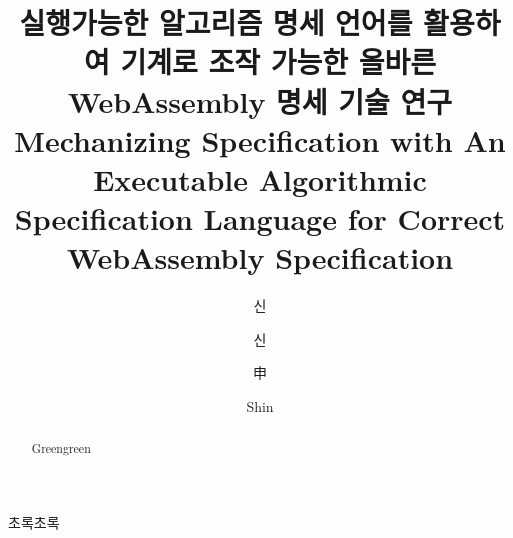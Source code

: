 \documentclass[master,english,draft]{kaist-ucs} %
\title[korean] {실행가능한 알고리즘 명세 언어를 활용하여 기계로 조작 가능한 올바른 WebAssembly 명세 기술 연구}
\title[english]{Mechanizing Specification with An Executable Algorithmic Specification Language for Correct WebAssembly Specification}
\author[korean] {신}{원 호}
\author[korean2] {신}{원호}    %
\author[chinese]{申}{元 鎬}
\author[english]{Shin}{Wonho}
\begin{document}

 \thesisinfo
  \begin{summary}
  초록초록

  \end{summary}

  \begin{Korkeyword}
  \end{Korkeyword}


  \begin{abstract}
  Greengreen
  \end{abstract}

  \begin{Engkeyword}
  \end{Engkeyword}


  \addtocounter{pagemarker}{1}                 %
  \newpage



  \tableofcontents

  \listoftables

  \listoffigures
















\end{document}
